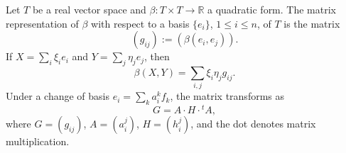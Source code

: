 Let $T$ be a real vector space and $\beta: T \times T \to \mathbb{R}$ a quadratic form. The matrix representation of $\beta$ with respect to a basis $\{e_i\}$, $1 \leq i \leq n$, of $T$ is the matrix
$$(g_{ij}) := (\beta(e_i, e_j)).$$
If $X = \sum_i \xi_i e_i$ and $Y = \sum_j \eta_j e_j$, then
$$\beta(X, Y) = \sum_{i,j} \xi_i \eta_j g_{ij}.$$
Under a change of basis $e_i = \sum_k a_i^k f_k$, the matrix transforms as
$$G = A \cdot H \cdot {}^t\!A,$$
where $G = (g_{ij})$, $A = (a_i^j)$, $H = (h_i^j)$, and the dot denotes matrix multiplication.
